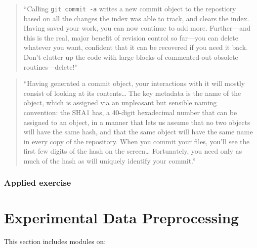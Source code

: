 \documentclass[]{tufte-book}
\begin{document}
\begin{quote}
``Calling \texttt{git\ commit\ -a} writes a new commit object to the repostiory based on
all the changes the index was able to track, and clears the index. Having saved your
work, you can now continue to add more. Further---and this is the real, major
benefit of revision control so far---you can delete whatever you want, confident
that it can be recovered if you need it back. Don't clutter up the code with large
blocks of commented-out obsolete routines---delete!'' \citep{klemens201421st}
\end{quote}

\begin{quote}
``Having generated a commit object, your interactions with it will mostly consist of
looking at its contents\ldots{} The key metadata is the name of the object, which is
assigned via an unpleasant but sensible naming convention: the SHA1 has, a
40-digit hexadecimal number that can be assigned to an object, in a manner that
lets us assume that no two objects will have the same hash, and that the same object
will have the same name in every copy of the repository. When you commit your files,
you'll see the first few digits of the hash on the screen\ldots{} Fortunately, you
need only as much of the hash as will uniquely identify your commit.''
\citep{klemens201421st}
\end{quote}

\hypertarget{applied-exercise-3}{%
\subsection{Applied exercise}\label{applied-exercise-3}}

\hypertarget{experimental-data-preprocessing}{%
\chapter{Experimental Data Preprocessing}\label{experimental-data-preprocessing}}

This section includes modules on:
\end{document}
